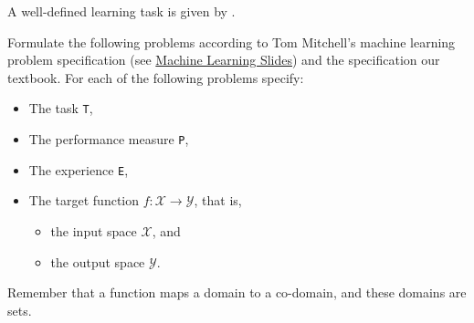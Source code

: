 A well-defined learning task is given by {\tt <P, T, E>}.

\begin{questions}

\question Formulate the following problems according to Tom Mitchell's machine learning problem specification (see \href{https://drcs.codes/ai/slides/machine-learning.pdf}{Machine Learning Slides}) and the specification our textbook. For each of the following problems specify:

\begin{itemize}
\item The task {\tt T},
\item The performance measure {\tt P},
\item The experience {\tt E},
\item The target function $f: \mathcal{X} \rightarrow \mathcal{Y}$, that is,
\begin{itemize}
\item the input space $\mathcal{X}$, and
\item the output space $\mathcal{Y}$.
\end{itemize}
\end{itemize}

Remember that a function maps a domain to a co-domain, and these domains are sets.

\end{questions}
